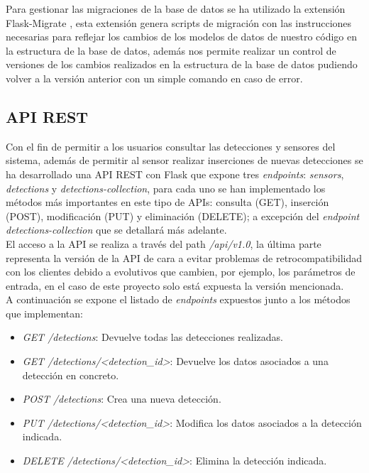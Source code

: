 \documentclass[../proyecto.tex]{subfiles}
\begin{document}
Para gestionar las migraciones de la base de datos se ha utilizado la extensión Flask-Migrate \cite{flask_migrate}, esta extensión genera scripts de migración con las instrucciones necesarias para reflejar los cambios de los modelos de datos de nuestro código en la estructura de la base de datos, además nos permite realizar un control de versiones de los cambios realizados en la estructura de la base de datos pudiendo volver a la versión anterior con un simple comando en caso de error.\\

\subsection{API REST}
Con el fin de permitir a los usuarios consultar las detecciones y sensores del sistema, además de permitir al sensor realizar inserciones de nuevas detecciones se ha desarrollado una API REST con Flask que expone tres \textit{endpoints}: \textit{sensors}, \textit{detections} y \textit{detections-collection}, para cada uno se han implementado los métodos más importantes en este tipo de APIs: consulta (GET), inserción (POST), modificación (PUT) y eliminación (DELETE); a excepción del \textit{endpoint detections-collection} que se detallará más adelante.\\

El acceso a la API se realiza a través del path \textit{/api/v1.0}, la última parte representa la versión de la API de cara a evitar problemas de retrocompatibilidad con los clientes debido a evolutivos que cambien, por ejemplo, los parámetros de entrada, en el caso de este proyecto solo está expuesta la versión mencionada.\\

A continuación se expone el listado de \textit{endpoints} expuestos junto a los métodos que implementan:\\


\begin{itemize}
  \item \textit{GET /detections}:  Devuelve todas las detecciones realizadas.
  \item \textit{GET /detections/<detection\_id>}: Devuelve los datos asociados a una detección en concreto.
  \item \textit{POST /detections}: Crea una nueva detección.
  \item \textit{PUT /detections/<detection\_id>}: Modifica los datos asociados a la detección indicada.
  \item \textit{DELETE /detections/<detection\_id>}: Elimina la detección indicada.
\end{itemize}
\end{document}
